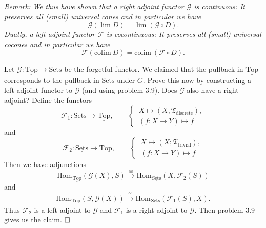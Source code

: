 \documentclass[11pt]{book}
\numberwithin{dummy}{section}
\theoremstyle{nonumberbreak}
\newenvironment{sol}[1][]{\ifthenelse{\equal{#1}{}}{\solution}{\solution[#1]}\rm}{\endsolution}
\newenvironment{prob}[1][]{\ifthenelse{\equal{#1}{}}{\problem}{\problem[#1]}\rm}{\endproblem}
\newcommand{\Hom}{\mathrm{Hom}\hspace{1pt}}
\newcommand{\sets}{\underline{\mathrm{Sets}}}
\newcommand{\topsp}{\underline{\mathrm{Top}}}
\newcommand{\F}{\mathcal{F}}
\newcommand{\G}{\mathcal{G}}
\newcommand{\la}{\longrightarrow}
\begin{document}
\begin{spacing}{1.4}
\begin{prob}
\begin{sol}
\begin{compactenum}
\end{compactenum}


\textit{Remark: We thus have shown that a right adjoint functor $\G$ is continuous: It preserves all (small) universal cones and in particular we have}
$$\G (\lim D) = \lim (\G \circ D).$$
\textit{Dually, a left adjoint functor $\F$ is cocontinuous: It preserves all (small) universal cocones and in particular we have}
$$\F (\mathrm{colim} \ D) = \mathrm{colim} \ (\F \circ D).$$


\end{sol}

\end{prob}







\begin{prob}   %
Let $\G: \topsp \la \sets$ be the forgetful functor. We claimed that the pullback in $\topsp$ corresponds to the pullback in $\sets$ under $G$. Prove this now by constructing a left adjoint functor to $\G$ (and using problem 3.9). Does $\G$ also have a right adjoint?
\begin{sol}
Define the functors
$$\F_1: \sets \la \topsp, \qquad \begin{cases} \ X \mapsto (X, \mathfrak{T}_{\mathrm{discrete}}), \\ \ (f: X \la Y) \mapsto f \end{cases} $$ 
and 
$$\F_2: \sets \la \topsp, \qquad \begin{cases} \ X \mapsto (X; \mathfrak{T}_{\mathrm{trivial}}), \\ \ (f: X \la Y) \mapsto f \end{cases} $$
Then we have adjunctions
$$\Hom_{\topsp}(\G(X), S) \overset{\cong}{\la} \Hom_{\sets}(X, \F_2(S))$$
and
$$\Hom_{\topsp}(S, \G(X)) \overset{\cong}{\la} \Hom_{\sets}(\F_1(S), X).$$
Thus $\F_ 2$ is a left adjoint to $\G$ and $\F_1$ is a right adjoint to $\G$. Then problem 3.9 gives us the claim. $\hfill \Box$

\end{sol}

\end{prob}





\end{spacing}
\end{document}
